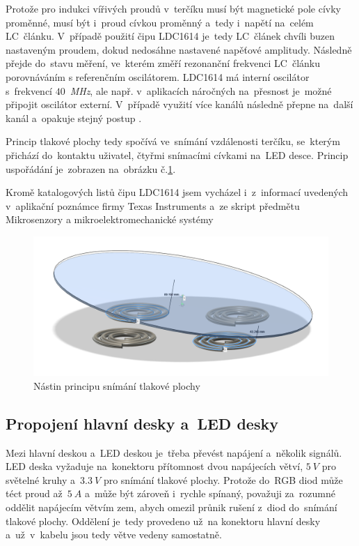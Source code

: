 Protože pro indukci vířivých proudů v~terčíku musí být magnetické pole cívky proměnné, musí být i~proud cívkou proměnný a~tedy i~napětí na~celém LC~článku.
V~případě použití čipu LDC1614 je~tedy LC~článek chvíli buzen nastaveným proudem, dokud nedosáhne nastavené napěťové amplitudy.
Následně přejde do~stavu měření, ve~kterém změří rezonanční frekvenci LC~článku porovnáváním s referenčním oscilátorem.
LDC1614 má interní oscilátor s~frekvencí \(40\)~{\itshape MHz}, ale např. v~aplikacích náročných na~přesnost je~možné připojit oscilátor externí. 
V~případě využití více kanálů následně přepne na~další kanál a~opakuje stejný postup \cite{LDC1614}.

Princip tlakové plochy tedy spočívá ve~snímání vzdálenosti terčíku, se~kterým přichází do~kontaktu uživatel, čtyřmi snímacími cívkami na~LED desce.
Princip uspořádání je~zobrazen na~obrázku č.\ref{fig:nastin-tlakovky}.

Kromě katalogových listů čipu LDC1614 jsem vycházel i~z~informací uvedených v~aplikační poznámce firmy Texas Instruments \cite{LDC1614SensorDesign} a~ze skript předmětu Mikrosenzory a mikroelektromechanické systémy \cite{SkriptaMMS}

\begin{figure}[h!]
    \centering
    \includegraphics[width=\textwidth]{text/PraktickaCast/img/naklonena-tlakovka.png}
    \caption{Nástin principu snímání tlakové plochy}
    \label{fig:nastin-tlakovky}
\end{figure}

\subsection{Propojení hlavní desky a~LED desky}
Mezi hlavní deskou a~LED deskou je~třeba převést napájení a~několik signálů.
LED deska vyžaduje na~konektoru přítomnost dvou napájecích větví, \(5~V\) pro světelné kruhy a~\(3.3~V\) pro snímání tlakové plochy.
Protože do~RGB diod může téct proud až~\(5~A\) a~může být zároveň i~rychle spínaný, považuji za~rozumné oddělit napájecím větvím zem, abych omezil průnik rušení z~diod do~snímání tlakové plochy.
Oddělení je~tedy provedeno už~na konektoru hlavní desky a~už~v~kabelu jsou tedy větve vedeny samostatně.

